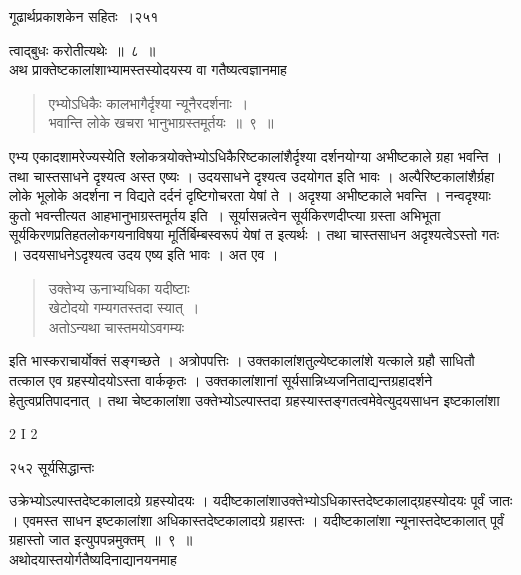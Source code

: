 \documentclass[11pt, openany]{book}
\begin{document}
\newpage


\hspace{3cm} गूढार्थप्रकाशकेन सहितः~।\hfill  २५१
\vspace{1cm}


\noindent त्वाद्बुधः करोतीत्यथेः~॥~८~॥ \\
\noindent अथ प्राक्तेष्टकालांशाभ्यामस्तस्योदयस्य वा गतैष्यत्वज्ञानमाह \textendash

\begin{quote}
{\ssi एभ्योऽधिकैः कालभागैर्दृश्या न्यूनैरदर्शनाः~।\\
 भवान्ति लोके खचरा भानुभाग्रस्तमूर्तयः~॥~९~॥ }
\end{quote}

 एभ्य एकादशामरेज्यस्येति श्लोकत्रयोक्तेभ्योऽधिकैरिष्टकालांशैर्दृश्या दर्शनयोग्या अभीष्टकाले ग्रहा भवन्ति । तथा चास्तसाधने दृश्यत्व अस्त एष्यः । उदयसाधने दृश्यत्व उदयोगत इति भावः । अल्पैरिष्टकालांशैर्ग्रहा लोके भूलोके अदर्शना न विद्यते दर्दनं दृष्टिगोचरता येषां ते । अदृश्या अभीष्टकाले भवन्ति । नन्वदृश्याः कुतो भवन्तीत्यत आह\textendash भानुभाग्रस्तमूर्तय इति~। सूर्यासन्नत्वेन सूर्यकिरणदीप्त्या ग्रस्ता अभिभूता सूर्यकिरणप्रतिहतलोकगयनाविषया मूर्तिर्बिम्बस्वरूपं येषां त इत्यर्थः । तथा चास्तसाधन अदृश्यत्वेऽस्तो गतः । उदयसाधनेऽदृश्यत्व उदय एष्य इति भावः । अत एव । 


\begin{quote}
{\qt उक्तेभ्य ऊनाभ्यधिका यदीष्टाः \\
खेटोदयो गम्यगतस्तदा स्यात्~। \\
अतोऽन्यथा चास्तमयोऽवगम्यः \\}
\end{quote}

इति भास्कराचार्योक्तं सङ्गच्छते । अत्रोपपत्तिः । उक्तकालांशतुल्येष्टकालांशे यत्काले ग्रहौ साधितौ तत्काल एव ग्रहस्योदयोऽस्ता वार्ककृतः । उक्तकालांशानां सूर्यसान्निध्यजनिताद्यन्तग्रहादर्शने हेतुत्वप्रतिपादनात् । तथा चेष्टकालांशा उक्तेभ्योऽल्पास्तदा ग्रहस्यास्तङ्गतत्वमेवेत्युदयसाधन इष्टकालांशा


{\tiny{2 I 2}}

\newpage


\noindent २५२ \hspace{4cm} सूर्यसिद्धान्तः
\vspace{1cm}


\noindent उक्रेभ्योऽल्पास्तदेष्टकालादग्रे ग्रहस्योदयः । यदीष्टकालांशाउक्तेभ्योऽधिकास्तदेष्टकालाद्ग्रहस्योदयः पूर्वं जातः । एवमस्त साधन इष्टकालांशा अधिकास्तदेष्टकालादग्रे ग्रहास्तः । यदीष्टकालांशा न्यूनास्तदेष्टकालात् पूर्वं ग्रहास्तो जात इत्युपपन्नमुक्तम्~॥~९~॥ \\
\noindent अथोदयास्तयोर्गतैष्यदिनाद्यानयनमाह \textendash 
\end{document}

